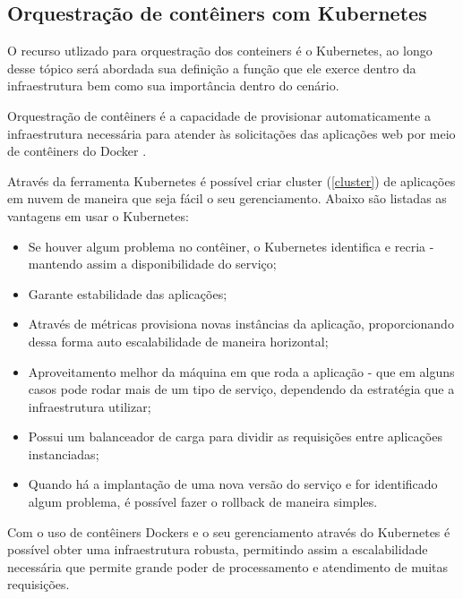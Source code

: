\subsection{Orquestração de contêiners com Kubernetes}\label{kubernetes}

O recurso utlizado para orquestração dos conteiners é o Kubernetes, ao longo desse 
tópico será abordada sua definição a função que ele exerce dentro da infraestrutura
bem como sua importância dentro do cenário.

\begin{citacao}
Orquestração de contêiners é a capacidade de provisionar automaticamente
a infraestrutura necessária para atender às solicitações das aplicações web
por meio de contêiners do Docker \cite{docker-kubernetes-e-openshift}.
\end{citacao}

Através da ferramenta Kubernetes é possível criar cluster (\autoref{cluster})
de aplicações em nuvem de maneira que seja fácil o seu gerenciamento.
Abaixo são listadas as vantagens em usar o Kubernetes:

\begin{itemize}

	\item Se houver algum problema no contêiner, o Kubernetes identifica e recria -
          mantendo assim a disponibilidade do serviço;
    \item Garante estabilidade das aplicações;
    \item Através de métricas provisiona novas instâncias da aplicação,
          proporcionando dessa forma auto escalabilidade de maneira horizontal;
    \item Aproveitamento melhor da máquina em que roda a aplicação - que em alguns
          casos pode rodar mais de um tipo de serviço, dependendo da estratégia
          que a infraestrutura utilizar;
    \item Possui um balanceador de carga para dividir as requisições entre
          aplicações instanciadas;
    \item Quando há a implantação de uma nova versão do serviço e for identificado
          algum problema, é possível fazer o rollback de maneira simples.

\end{itemize}

Com o uso de contêiners Dockers e o seu gerenciamento através do Kubernetes é possível
obter uma infraestrutura robusta, permitindo assim a escalabilidade necessária que permite
grande poder de processamento e atendimento de muitas requisições.
